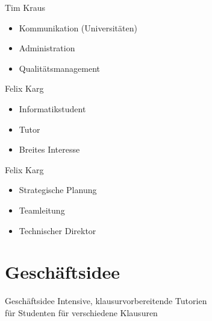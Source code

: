 \begin{frame}[c]{Tim Kraus}
    \Large
    \begin{itemize}[<+(1)->]
    \item Kommunikation (Universitäten)
    \item Administration
    \item Qualitätsmanagement
    \end{itemize}
\end{frame}

\begin{frame}[c]{Felix Karg}
    \Large
    \begin{itemize}[<+(1)->]
    \item Informatikstudent
    \item Tutor
    \item Breites Interesse
    \end{itemize}
\end{frame}


\begin{frame}[c]{Felix Karg}
    \Large
    \begin{itemize}[<+(1)->]
    \item Strategische Planung
    \item Teamleitung
    \item Technischer Direktor
    \end{itemize}
\end{frame}



\section{Geschäftsidee}

\begin{frame}[c]{Geschäftsidee}
    \Large
    Intensive, klausurvorbereitende Tutorien \\
    für Studenten für verschiedene Klausuren
\end{frame}

% 
% 

